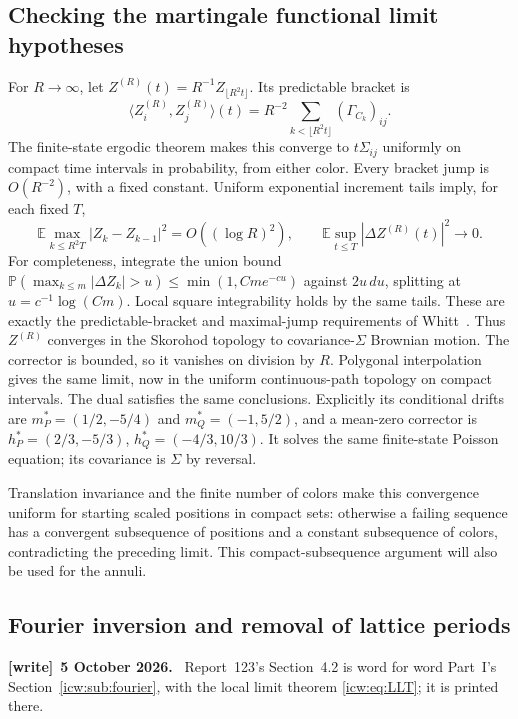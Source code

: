 \documentclass[11pt,letterpaper]{article}
\theoremstyle{remark}\newtheorem{remark}[theorem]{Remark}
\newcommand{\Prob}{\mathbb P}
\newcommand{\E}{\mathbb E}
\newcommand{\1}{\mathbf1}
\newenvironment{writenote}[1][]{\par\smallskip\begingroup\small
 \noindent\textbf{[write]}\if\relax\detokenize{#1}\relax\else~\textbf{#1.}\fi\ }%
 {\par\endgroup\smallskip}
\begin{document}
\subsection{Checking the martingale functional limit hypotheses}
For $R\to\infty$, let $Z^{(R)}(t)=R^{-1}Z_{\lfloor R^2t\rfloor}$.
Its predictable bracket is
\[
 \langle Z^{(R)}_i,Z^{(R)}_j\rangle(t)
   =R^{-2}\sum_{k<\lfloor R^2t\rfloor}(\Gamma_{C_k})_{ij}.
\]
The finite-state ergodic theorem makes this converge to $t\Sigma_{ij}$
uniformly on compact time intervals in probability, from either color.
Every bracket jump is $O(R^{-2})$, with a fixed constant. Uniform
exponential increment tails imply, for each fixed $T$,
\[
 \E\max_{k\le R^2T}|Z_k-Z_{k-1}|^2=O((\log R)^2),
 \qquad
 \E\sup_{t\le T}|\Delta Z^{(R)}(t)|^2\longrightarrow0.
\]
For completeness, integrate the union bound
$\Prob(\max_{k\le m}|\Delta Z_k|>u)\le\min(1,Cme^{-cu})$ against
$2u\,du$, splitting at $u=c^{-1}\log(Cm)$. Local square integrability
holds by the same tails. These are exactly the predictable-bracket and
maximal-jump requirements of Whitt~\cite[Theorem 2.1(ii)]{whitt}.
Thus $Z^{(R)}$ converges in the Skorohod topology to covariance-$\Sigma$
Brownian motion. The corrector is bounded, so it vanishes on division by
$R$. Polygonal interpolation gives the same limit, now in the uniform
continuous-path topology on compact intervals. The dual satisfies the
same conclusions. Explicitly its conditional drifts are
$m_P^*=(1/2,-5/4)$ and $m_Q^*=(-1,5/2)$, and a mean-zero corrector is
$h_P^*=(2/3,-5/3)$, $h_Q^*=(-4/3,10/3)$. It solves the same
finite-state Poisson equation; its covariance is $\Sigma$ by reversal.

Translation invariance and the finite number of colors make this
convergence uniform for starting scaled positions in compact sets:
otherwise a failing sequence has a convergent subsequence of positions
and a constant subsequence of colors, contradicting the preceding limit.
This compact-subsequence argument will also be used for the annuli.

\subsection{Fourier inversion and removal of lattice periods}\label{icw:log:sub:fourier}
\begin{writenote}[5 October 2026]
Report~123's Section~4.2 is word for word Part~I's Section~\ref{icw:sub:fourier}, with the local limit theorem \eqref{icw:eq:LLT}; it is printed there.
\end{writenote}
\end{document}
